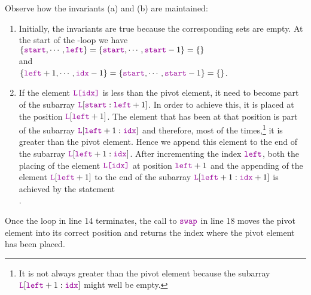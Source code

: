 \begin{enumerate}
      Observe how the invariants (a) and (b) are maintained:
      \begin{enumerate}
      \item Initially, the invariants are true because the corresponding sets are empty.
            At the start of the -loop we have
            \\[0.2cm]
            \hspace*{1.3cm}
            $\{ \mytt{start}, \cdots, \mytt{left} \} = \{ \mytt{start}, \cdots, \mytt{start} - 1\} = \{\}$
            \\
            and
            \\
            \hspace*{1.3cm}
            $\{ \mytt{left}+1,\cdots,\mytt{idx}-1\} =  \{ \mytt{start},\cdots,\mytt{start}-1\}=\{\}$.
      \item If the element $\mytt{L[idx]}$ is less than the
            pivot element, it need to become part of the subarray $\mytt{L}[\mytt{start}:\mytt{left}+1]$.  In order to
            achieve this, it is placed at the position $\mytt{L}[\mytt{left}+1]$.  The element that has been at
            that position is part of the subarray $\mytt{L}[\mytt{left}+1:\mytt{idx}]$ and therefore,
            most of the times,\footnote{
              It is not always greater than the pivot element
              because the subarray $\mytt{L}[\mytt{left}+1:\mytt{idx}]$ might well be empty.}
            it is greater than the pivot element.  
            Hence we append this element to the end of the subarray
            $\mytt{L}[\mytt{left}+1:\mytt{idx}]$.  After incrementing the index $\mytt{left}$,
            both the placing of the element $\mytt{L[idx]}$ at position $\mytt{left}+1$ and the appending
            of the element $\mytt{L}[\mytt{left}+1]$ to the end of the subarray
            $\mytt{L}[\mytt{left}+1:\mytt{idx}+1]$ is achieved by the statement
            \\[0.2cm]
            \hspace*{1.3cm}
            .            
      \end{enumerate}
      Once the  loop in line 14 terminates, the call to $\mytt{swap}$ in line 18 moves
      the pivot element into its correct position and returns the index where the pivot element has been
      placed. 
\end{enumerate}


